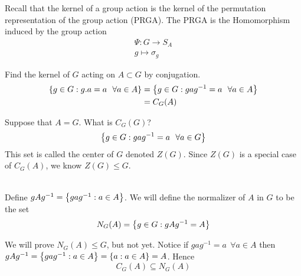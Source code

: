 Recall that the kernel of a group action is the kernel of the permutation representation of the group action (PRGA). The PRGA is the Homomorphism induced by the group action
\begin{align*}
    \Psi : G \to S_A \\
    g \mapsto \sigma_g
\end{align*}

\begin{example}
    Find the kernel of $G$ acting on $A \subset G$ by conjugation.
    \begin{align*}
        \left\{g \in G : g.a = a ~~ \forall a \in A\right\} &= \left\{g \in G : gag^{-1} = a ~~\forall a \in A\right\} \\
        &= C_G(A)
    \end{align*}
\end{example}

Suppose that $A = G$. What is $C_G(G)$?
$$\left\{g \in G : gag^{-1}=a ~~\forall a \in G\right\}$$
This set is called the center of $G$ denoted $Z(G)$. Since $Z(G)$ is a special case of $C_G(A)$, we know $Z(G) \leq G$.

\begin{definition}[Normalizer] \leavevmode \\
    Define $gAg^{-1} = \left\{gag^{-1} : a \in A\right\}$. We will define the normalizer of $A$ in $G$ to be the set 
    $$N_G(A) = \left\{g \in G : gAg^{-1} = A\right\}$$
\end{definition}

We will prove $N_G(A) \leq G$, but not yet.
Notice if $gag^{-1} = a ~~ \forall a \in A$ then $gAg^{-1} = \left\{gag^{-1} : a \in A\right\} = \left\{a : a \in A\right\} = A$. Hence
$$C_G(A) \subseteq N_G(A)$$

